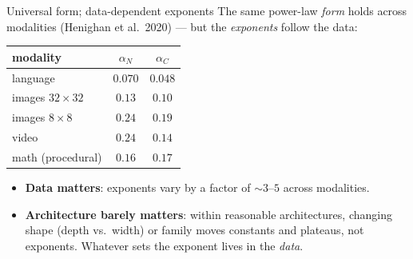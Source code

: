 \documentclass[11pt]{beamer}
\newcommand{\hl}[1]{{\color{blue!60!black}\textbf{#1}}}
\begin{document}
\begin{frame}{Universal form; data-dependent exponents}
  The same power-law \emph{form} holds across modalities (Henighan et
  al.\ 2020) --- but the \emph{exponents} follow the data:
  \begin{center}\small
  \begin{tabular}{l|cc}
    modality & $\alpha_N$ & $\alpha_C$ \\\hline
    language & $0.070$ & $0.048$ \\
    images $32{\times}32$ & $0.13$ & $0.10$ \\
    images $8{\times}8$ & $0.24$ & $0.19$ \\
    video & $0.24$ & $0.14$ \\
    math (procedural) & $0.16$ & $0.17$
  \end{tabular}
  \end{center}
  \vspace{1mm}
  \begin{itemize}
    \item \hl{Data matters}: exponents vary by a factor of
      $\sim\!3$--$5$ across modalities. 
    \item \hl{Architecture barely matters}: within reasonable
      architectures, changing shape (depth vs.\ width) or family moves
      constants and plateaus, not exponents. Whatever sets the exponent
      lives in the \emph{data}.
  \end{itemize}
\end{frame}
\end{document}
